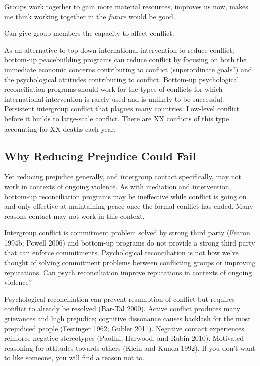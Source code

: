 \documentclass[11pt]{article}
\begin{document}
Groups work together to gain more material resources, improves us now,
makes me think working together in the \emph{future} would be good.

Can give group members the capacity to affect conflict.

As an alternative to top-down international intervention to reduce
conflict, bottom-up peacebuilding programs can reduce conflict by
focusing on both the immediate economic concerns contributing to
conflict (superordinate goals?) and the psychological attitudes
contributing to conflict. Bottom-up psychological reconciliation
programs should work for the types of conflicts for which international
intervention is rarely used and is unlikely to be successful. Persistent
intergroup conflict that plagues many countries. Low-level conflict
before it builds to large-scale conflict. There are XX conflicts of this
type accounting for XX deaths each year.

\subsection{Why Reducing Prejudice Could
Fail}\label{why-reducing-prejudice-could-fail}

Yet reducing prejudice generally, and intergroup contact specifically,
may not work in contexts of ongoing violence. As with mediation and
intervention, bottom-up reconciliation programs may be ineffective while
conflict is going on and only effective at maintaining peace once the
formal conflict has ended. Many reasons contact may not work in this
context.

Intergroup conflict is commitment problem solved by strong third party
(Fearon 1994b; Powell 2006) and bottom-up programs do not provide a
strong third party that can enforce commitments. Psychological
reconciliation is not how we've thought of solving commitment problems
between conflicting groups or improving reputations. Can psych
reconciliation improve reputations in contexts of ongoing violence?

Psychological reconciliation can prevent resumption of conflict but
requires conflict to already be resolved (Bar-Tal 2000). Active conflict
produces many grievances and high prejudice; cognitive dissonance causes
backlash for the most prejudiced people (Festinger 1962; Gubler 2011).
Negative contact experiences reinforce negative stereotypes (Paolini,
Harwood, and Rubin 2010). Motivated reasoning for attitudes towards
others (Klein and Kunda 1992). If you don't want to like someone, you
will find a reason not to.
\end{document}
